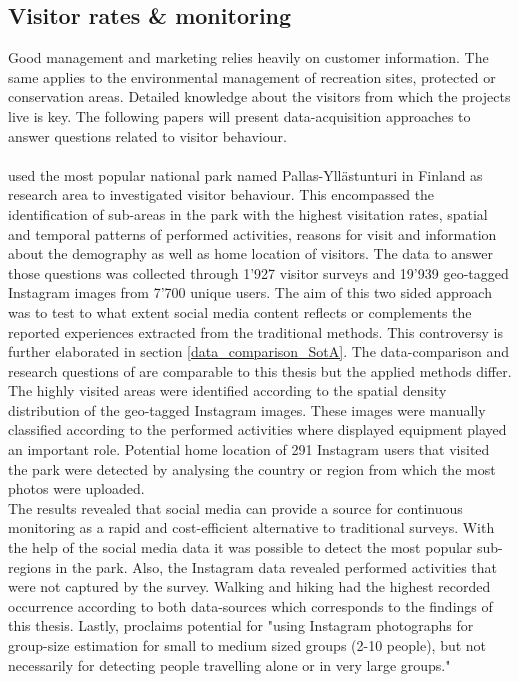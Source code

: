\subsection{Visitor rates \& monitoring}
Good management and marketing relies heavily on customer information. The same applies to the environmental management of recreation sites, protected or conservation areas. Detailed knowledge about the visitors from which the projects live is key. The following papers will present data-acquisition approaches to answer questions related to visitor behaviour.  

\paragraph*{\textcite{Heikinheimo2017}} used the most popular national park named Pallas-Yll\"astunturi in Finland as research area to investigated visitor behaviour. This encompassed the identification of sub-areas in the park with the highest visitation rates, spatial and temporal patterns of performed activities, reasons for visit and information about the demography as well as home location of visitors. The data to answer those questions was collected through 1'927 visitor surveys and 19'939 geo-tagged Instagram images from 7'700 unique users. The aim of this two sided approach was to test to what extent social media content reflects or complements the reported experiences extracted from the traditional methods. This controversy is further elaborated in section \ref{data_comparison_SotA}. The data-comparison and research questions of \textcite{Heikinheimo2017} are comparable to this thesis but the applied methods differ.
The highly visited areas were identified according to the spatial density distribution of the geo-tagged Instagram images. These images were manually classified according to the performed activities where displayed equipment played an important role. Potential home location of 291 Instagram users that visited the park were detected by analysing the country or region from which the most photos were uploaded. \\
The results revealed that social media can provide a source for continuous monitoring as a rapid and cost-efficient alternative to traditional surveys. With the help of the social media data it was possible to detect the most popular sub-regions in the park. Also, the Instagram data revealed performed activities that were not captured by the survey. Walking and hiking had the highest recorded occurrence according to both data-sources which corresponds to the findings of this thesis. Lastly, \textcite{Heikinheimo2017} proclaims potential for "using Instagram photographs for group-size estimation for small to medium sized groups (2-10 people), but not necessarily for detecting people travelling alone or in very large groups." 

